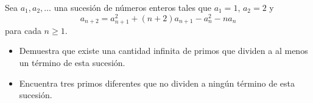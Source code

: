 Sea $a_1, a_2, \dots$ una sucesión de números enteros tales que $a_1 = 1$, $a_2 = 2$ y 
\[a_{n+2} =a^2_{n+1} +(n+2)a_{n+1} -a^2_n -na_n\] para cada $n \geq 1$.
 \begin{itemize} 
 \item  Demuestra que existe una cantidad infinita de primos que dividen a al menos un término de esta sucesión.
 \item Encuentra tres primos diferentes que no dividen a ningún término de esta sucesión.
 \end{itemize} 

